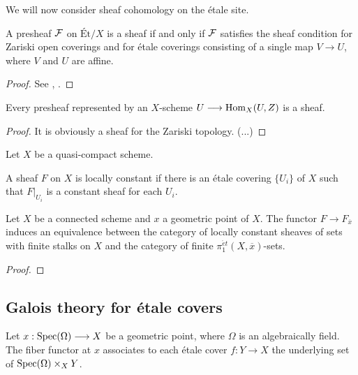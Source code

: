 We will now consider sheaf cohomology on the \'etale site. 

\begin{theorem}
  A presheaf $\mathcal{F}$ on $\text{\'Et}/X$ is a sheaf if and only if $\mathcal{F}$ satisfies the sheaf condition for Zariski open coverings and for \'etale coverings consisting of a single map $V \to U$, where $V$ and $U$ are affine.
\end{theorem}
\begin{proof}
  See \cite{milneLEC}, .
\end{proof}
\begin{corollary}
  Every presheaf represented by an $X$-scheme $U \longrightarrow \operatorname{Hom}_X(U,Z)$ is a sheaf. 
\end{corollary}
\begin{proof}
  It is obviously a sheaf for the Zariski topology. (...)
\end{proof}

\begin{definition}
  Let $X$ be a quasi-compact scheme. 
\end{definition}

\begin{definition}
  A sheaf $F$ on $X$ is locally constant if there is an \'etale covering $\{U_i\}$ of $X$ such that $F|_{U_i}$ is a constant sheaf for each $U_i$.
\end{definition}

\begin{proposition}
  Let $X$ be a connected scheme and $x$ a geometric point of $X$. The functor $F \to F_{\overline{x}}$ induces an equivalence between the category of locally constant sheaves of sets with finite stalks on $X$ and the category of finite $\pi_1^{\acute{e}t}(X,\overline{x})$-sets.
\end{proposition}
\begin{proof}
  
\end{proof}

\subsection{Galois theory for \'etale covers}
\begin{definition}
  Let $x: \operatorname{Spec}(\Omega) \longrightarrow X$ be a geometric point, where $\Omega$ is an algebraically field. The fiber functor at $x$ associates to each \'etale cover $f: Y \to X$ the underlying set of $\operatorname{Spec}(\Omega) \times_X Y$.
\end{definition}

